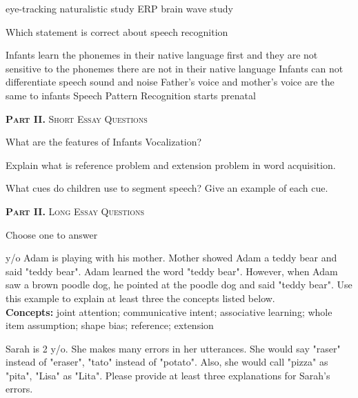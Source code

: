 \documentclass[legalpaper, 12pt, addpoints, answers]{exam}
\begin{document}
\begin{questions}
\begin{choices}
      \choice eye-tracking
      \choice naturalistic study
      \choice ERP
      \choice brain wave study
\end{choices} 

\question Which statement is correct about speech recognition

\begin{choices}
      \choice Infants learn the phonemes in their native language first and they are not sensitive to the phonemes there are not in their native language
      \choice Infants can not differentiate speech sound and noise
      \choice Father's voice and mother's voice are the same to infants
      \choice Speech Pattern Recognition starts prenatal
\end{choices} 


\pagebreak
\parbox{5in}{
{\textsc{\textbf{Part II.} Short Essay Questions}}}

\vspace{0.10in}




\question What are the features of Infants Vocalization? 





\question Explain what is reference problem and extension problem in word acquisition.



\question What cues do children use to segment speech? Give an example of each cue.

\vspace{0.15in}

\parbox{5in}{
{\textsc{\textbf{Part II.} Long Essay Questions}}}

\vspace{0.10in}

Choose one to answer

 y/o Adam is playing with his mother. Mother showed Adam a teddy bear and said "teddy bear". Adam learned the word "teddy bear". However, when Adam saw a brown poodle dog, he pointed at the poodle dog and said "teddy bear". Use this example to explain at least three the concepts listed below. 
\\
\textbf{Concepts:} joint attention; communicative intent; associative learning; whole item assumption; shape bias; reference; extension


\question Sarah is 2 y/o. She makes many errors in her utterances. She would say "raser" instead of "eraser", "tato" instead of "potato". Also, she would call "pizza" as "pita", "Lisa" as "Lita". Please provide at least three explanations for Sarah's errors.

\end{questions}
\end{document}
